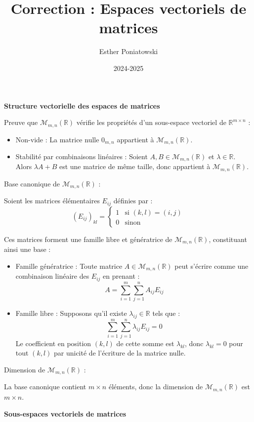 \documentclass[10pt,a4paper]{article}
\title{Correction : Espaces vectoriels de matrices}
\author{Esther Poniatowski}
\date{2024-2025}
\begin{document}
\textbf{Structure vectorielle des espaces de matrices}

\q Preuve que $\mathcal{M}_{m,n}(\mathbb{R})$ vérifie les propriétés d'un sous-espace vectoriel de
$\mathbb{R}^{m \times n}$ :

\begin{itemize}
    \item Non-vide : La matrice nulle $0_{m,n}$ appartient à $\mathcal{M}_{m,n}(\mathbb{R})$.
    \item Stabilité par combinaisons linéaires : Soient $A, B \in \mathcal{M}_{m,n}(\mathbb{R})$ et
    $\lambda \in \mathbb{R}$. Alors $\lambda A + B$ est une matrice de même taille, donc appartient
    à $\mathcal{M}_{m,n}(\mathbb{R})$.
\end{itemize}

\q Base canonique de $\mathcal{M}_{m,n}(\mathbb{R})$ :

Soient les matrices élémentaires $E_{ij}$ définies par :
\[ (E_{ij})_{kl} = \begin{cases} 1 & \text{si } (k,l) = (i,j) \\ 0 & \text{sinon} \end{cases} \]

Ces matrices forment une famille libre et génératrice de $\mathcal{M}_{m,n}(\mathbb{R})$,
constituant ainsi une base :
\begin{itemize}
    \item Famille génératrice : Toute matrice $A \in \mathcal{M}_{m,n}(\mathbb{R})$ peut s'écrire
    comme une combinaison linéaire des $E_{ij}$ en prenant : $$A = \sum_{i=1}^m \sum_{j=1}^n A_{ij}
    E_{ij}$$
    \item Famille libre : Supposons qu'il existe $\lambda_{ij} \in \mathbb{R}$ tels que :
    $$\sum_{i=1}^m \sum_{j=1}^n \lambda_{ij} E_{ij} = 0$$
    Le coefficient en position $(k,l)$ de cette somme est $\lambda_{kl}$, donc $\lambda_{kl} = 0$
    pour tout $(k,l)$ par unicité de l'écriture de la matrice nulle.
\end{itemize}


\q Dimension de $\mathcal{M}_{m,n}(\mathbb{R})$ :

La base canonique contient $m \times n$ éléments, donc la dimension de
$\mathcal{M}_{m,n}(\mathbb{R})$ est $m \times n$.

\bigskip
\textbf{Sous-espaces vectoriels de matrices}
\end{document}
